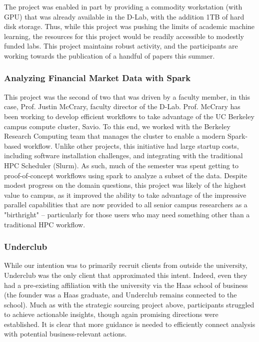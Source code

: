 \documentclass{sig-alternate}
\begin{document}
The project was enabled in part by providing a commodity workstation (with GPU) that was already available in the D-Lab, with the addition 1TB of hard disk storage. Thus, while this project was pushing the limits of academic machine learning, the resources for this project would be readily accessible to modestly funded labs. This project maintains robust activity, and the participants are working towards the publication of a handful of papers this summer.


\subsubsection*{Analyzing Financial Market Data with Spark}

This project was the second of two that was driven by a faculty member, in this case, Prof. Justin McCrary, faculty director of the D-Lab. Prof. McCrary has been working to develop efficient workflows to take advantage of the UC Berkeley campus compute cluster, Savio. To this end, we worked with the Berkeley Research Computing team that manages the cluster to enable a modern Spark-based workflow. Unlike other projects, this initiative had large startup costs, including software installation challenges, and integrating with the traditional HPC Scheduler (Slurm). As such, much of the semester was spent getting to proof-of-concept workflows using spark to analyze a subset of the data. Despite modest progress on the domain questions, this project was likely of the highest value to campus, as it improved the ability to take advantage of the impressive parallel capabilities that are now provided to all senior campus researchers as a "birthright" -- particularly for those users who may need something other than a traditional HPC workflow.


\subsubsection*{Underclub}

While our intention was to primarily recruit clients from outside the university, Underclub was the only client that approximated this intent. Indeed, even they had a pre-existing affiliation with the university via the Haas school of business (the founder was a Haas graduate, and Underclub remains connected to the school). Much as with the strategic sourcing project above, participants struggled to achieve actionable insights, though again promising directions were established. It is clear that more guidance is needed to efficiently connect analysis with potential business-relevant actions.
\end{document}
